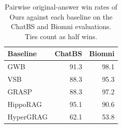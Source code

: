 \begin{table}
\caption{Pairwise original-answer win rates of Ours against each baseline on the ChatBS and Biomni evaluations. Ties count as half wins.}
\label{tab:original-answer-baseline-winrates}
\begin{tabular}{lrr}
\toprule
Baseline & ChatBS & Biomni \\
\midrule
GWB & 91.3 & 98.1 \\
VSB & 88.3 & 95.3 \\
GRASP & 88.3 & 97.2 \\
HippoRAG & 95.1 & 90.6 \\
HyperGRAG & 62.1 & 53.8 \\
\bottomrule
\end{tabular}
\end{table}
